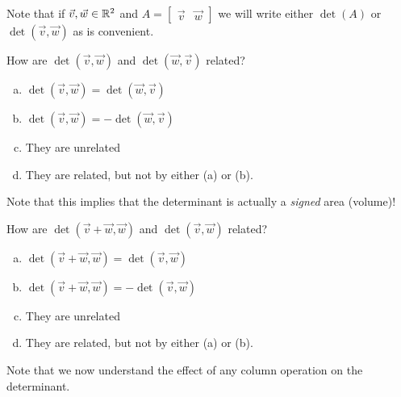 \begin{applicationActivities}{1}{25}
\begin{observation}
Note that if $\vec{v},\vec{w} \in \mathbb{R}^2$ and $A=\begin{bmatrix} \vec{v} & \vec{w}\end{bmatrix}$ we will write either $\det(A)$ or $\det(\vec{v},\vec{w})$ as is convenient.
\end{observation}

\begin{activity}{0}
\item How are $\det (\vec{v},\vec{w})$ and $\det(\vec{w},\vec{v})$ related?
\begin{enumerate}[(a)]
\item $\det(\vec{v},\vec{w}) = \det(\vec{w},\vec{v})$
\item $\det(\vec{v},\vec{w}) = -\det(\vec{w},\vec{v})$
\item They are unrelated
\item They are related, but not by either (a) or (b).
\end{enumerate}
\end{activity}


\begin{observation}
Note that this implies that the determinant is actually a \textit{signed} area (volume)!
\end{observation}

\begin{activity}{0}
\item How are $\det (\vec{v}+\vec{w},\vec{w})$ and $\det(\vec{v},\vec{w})$ related?
\begin{enumerate}[(a)]
\item $\det(\vec{v}+\vec{w},\vec{w}) = \det(\vec{v},\vec{w})$
\item $\det(\vec{v}+\vec{w},\vec{w}) = -\det(\vec{v},\vec{w})$
\item They are unrelated
\item They are related, but not by either (a) or (b).
\end{enumerate}
\end{activity}

\begin{observation}
  Note that we now understand the effect of any column operation on the determinant.
\end{observation}


\end{applicationActivities}
